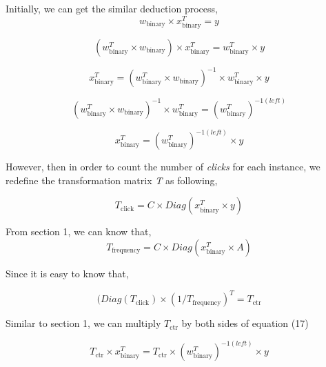 \documentclass{article}
\begin{document}
Initially, we can get the similar deduction process, 
\begin{equation}
w_{\text{binary}} \times x_{\text{binary}}^T = y 
\end{equation}

\begin{equation}
(w_{\text{binary}}^T \times w_{\text{binary}}) \times x_{\text{binary}}^T = w_{\text{binary}}^T \times y 
\end{equation}

\begin{equation}
x_{\text{binary}}^T = (w_{\text{binary}}^T \times w_{\text{binary}})^{-1} \times w_{\text{binary}}^T \times y 
\end{equation}

\begin{equation}
(w_{\text{binary}}^T \times w_{\text{binary}})^{-1} \times w_{\text{binary}}^T = (w_{\text{binary}}^T)^{-1(left)}  
\end{equation}

\begin{equation}
x_{\text{binary}}^T =  (w_{\text{binary}}^T)^{-1(left)} \times y 
\end{equation}

However, then in order to count the number of \textsl{clicks} for each instance, we redefine the transformation matrix \textsl{T} as following, 

\begin{equation}
T_{\text{click}} = C \times Diag(x_{\text{binary}}^T \times y)
\end{equation}



From section 1, we can know that, 
\begin{equation}
T_{\text{frequency}} = C \times Diag(x_{\text{binary}}^T \times A)
\end{equation}

Since it is easy to know that,

\begin{equation}
(Diag(T_{\text{click}}) \times (1/T_{\text{frequency}} )^T =  T_{\text{ctr}}
\end{equation}

Similar to section 1, we can multiply \(T_{\text{ctr}}\) by both sides of equation (17)

\begin{equation}
T_{\text{ctr}} \times x_{\text{binary}}^T =  T_{\text{ctr}} \times (w_{\text{binary}}^T)^{-1(left)} \times y 
\end{equation}
\end{document}
